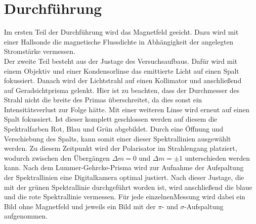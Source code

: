 \section{Durchführung}
\label{sec:Durchführung}

Im ersten Teil der Durchführung wird das Magnetfeld geeicht. Dazu wird mit einer Hallsonde die magnetische Flussdichte in Abhängigkeit der angelegten Stromstärke vermessen. \\
Der zweite Teil besteht aus der Justage des Versuchsaufbaus. Dafür wird mit einem Objektiv und einer Kondensorlinse das emittierte Licht auf einen Spalt fokussiert. Danach wird der Lichtstrahl auf einen Kollimator und anschließend auf Geradsichtprisma gelenkt. Hier ist zu beachten, dass der Durchmesser des Strahl nicht die breite des Primas überschreitet, da dies sonst ein Intensitätsverlust zur Folge hätte. Mit einer weiteren Linse wird erneut auf einen Spalt fokussiert. Ist dieser komplett geschlossen werden auf diesem die Spektralfarben Rot, Blau und Grün abgebildet. Durch eine Öffnung und Verschiebung des Spalts, kann somit einer dieser Spektrallinien ausgewählt werden. Zu diesem Zeitpunkt wird der Polarisator im Strahlengang platziert, wodurch zwischen den Übergängen $\Delta m=0$ und $\Delta m=\pm1$ unterschieden werden kann. Nach dem Lummer-Gehrcke-Prisma wird  zur Aufnahme der Aufspaltung der Spektrallinien eine Digitalkamera optimal justiert.
Nach dieser Justage, die mit der grünen Spektrallinie durchgeführt worden ist, wird anschließend die blaue und die rote Spektrallinie vermessen. Für jede einzelnenMessung wird dabei ein Bild ohne Magnetfeld und jeweils ein Bild mit der $\pi$- und $\sigma$-Aufspaltung aufgenommen.